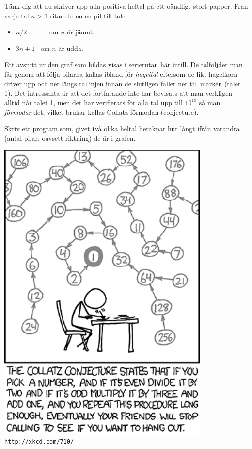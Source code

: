 
\begin{minipage}[t]{0.5\textwidth}
\vspace{0pt}
Tänk dig att du skriver upp alla positiva heltal på ett oändligt stort
papper. Från varje tal $n>1$ ritar du nu en pil till talet
\begin{itemize}
\item $n/2$ \ \ \ \ \ \ om $n$ är jämnt.
\item $3n+1$ \ om $n$ är udda.
\end{itemize}

Ett avsnitt ur den graf som bildas visas i serierutan här intill. De
talföljder man får genom att följa pilarna kallas ibland för {\em hageltal} eftersom de likt
hagelkorn driver upp och ner längs tallinjen innan de slutligen faller
ner till marken (talet 1). Det intressanta är att det fortfarande inte har bevisats att
man verkligen alltid når talet 1, men det har
verifierats för alla tal upp till $10^{19}$ så man {\em förmodar} det, vilket brukar kallas Collatz förmodan (conjecture).

Skriv ett program som, givet två olika heltal beräknar hur långt ifrån varandra (antal pilar,
oavsett riktning) de är i grafen.

\vfill
\end{minipage}
\begin{minipage}[t]{0.4\textwidth}
\vspace{0pt}
\begin{center}
\includegraphics[width=0.8\textwidth]{collatz.png} \\
\tt{http://xkcd.com/710/}
\end{center}


\end{minipage}

